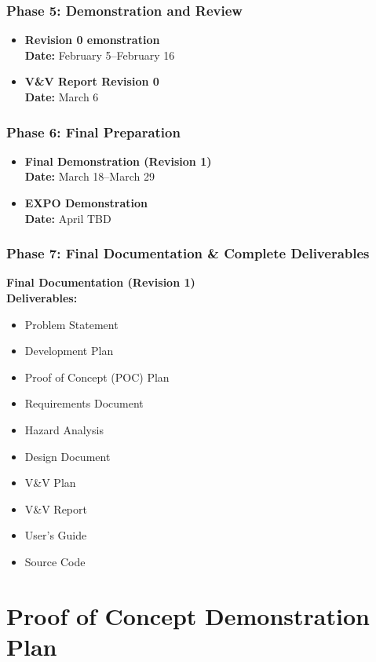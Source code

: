 \documentclass{article}
\begin{document}
\subsubsection*{Phase 5: Demonstration and Review}
\begin{itemize}
    \item \textbf{Revision 0 emonstration} \\
    \textbf{Date:} February 5–February 16
    \item \textbf{V\&V Report Revision 0} \\
    \textbf{Date:} March 6
\end{itemize}

\subsubsection*{Phase 6: Final Preparation}
\begin{itemize}
    \item \textbf{Final Demonstration (Revision 1)} \\
    \textbf{Date:} March 18–March 29
    \item \textbf{EXPO Demonstration} \\
    \textbf{Date:} April TBD
\end{itemize}

\subsubsection*{Phase 7: Final Documentation \& Complete Deliverables}
\textbf{Final Documentation (Revision 1)} \\
\textbf{Deliverables:}
\begin{itemize}
    \item Problem Statement
    \item Development Plan
    \item Proof of Concept (POC) Plan
    \item Requirements Document
    \item Hazard Analysis
    \item Design Document
    \item V\&V Plan
    \item V\&V Report
    \item User’s Guide
    \item Source Code
\end{itemize}

\section{Proof of Concept Demonstration Plan}
\end{document}
